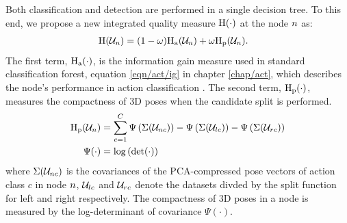 Both classification and detection are performed in a single decision tree. To this end, we propose a new integrated quality measure $\mathrm{H}(\cdot)$ at the node $n$ as:
\begin{align}
	\label{eq/body/newquality}
	\mathrm{H}(\mathcal{U}_{n}) & = (1 - \omega)\mathrm{H_{a}}(\mathcal{U}_{n}) + \omega\mathrm{H_{p}}(\mathcal{U}_{n}). 
\end{align}
The first term, $\mathrm{H_{a}}(\cdot)$, is the information gain measure used in standard classification forest, \cf equation \ref{eqn/act/ig} in chapter \ref{chap/act}, which describes the node's performance in action classification \cite{Breiman2001}. The second term, $\mathrm{H_{p}}(\cdot)$, measures the compactness of 3D poses when the candidate split is performed.  
\begin{align}
	\mathrm{H_{p}}(\mathcal{U}_{n}) & = \displaystyle\sum_{c = 1}^{C} \Psi\left(\Sigma(\mathcal{U}_{n c})\right) - \Psi\left(\Sigma(\mathcal{U}_{lc})\right) 
- \Psi\left(\Sigma(\mathcal{U}_{rc})\right) \\ 
	\Psi(\cdot) & = \log\left(\det(\cdot)\right)
\end{align} 
where $\Sigma(\mathcal{U}_{n c})$ is the covariances of the PCA-compressed pose vectors of action class $c$ in node $n$, $\mathcal{U}_{lc}$ and $\mathcal{U}_{rc}$ denote the datasets divded by the split function for left and right respectively. The compactness of 3D poses in a node is measured by the log-determinant of covariance $\Psi(\cdot)$. 

